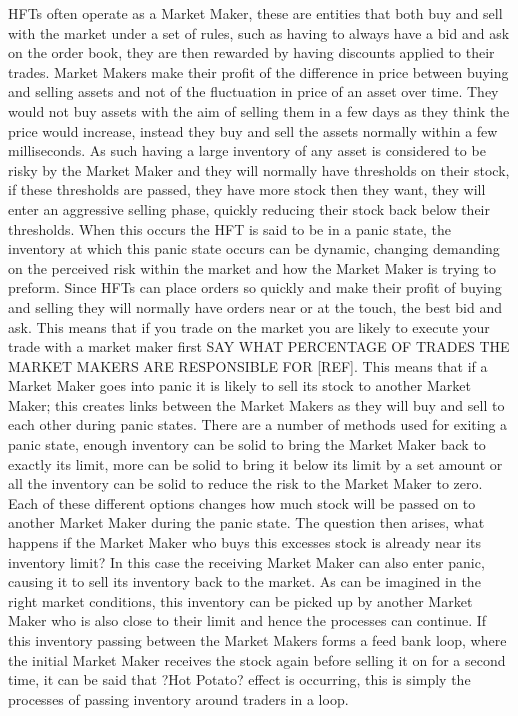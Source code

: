 \documentclass{article}
\begin{document}
HFTs often operate as a Market Maker, these are entities that both buy and sell with the market under a set of rules, such as having to always have a bid and ask on the order book, they are then rewarded by having discounts applied to their trades. Market Makers make their profit of the difference in price between buying and selling assets and not of the fluctuation in price of an asset over time. They would not buy assets with the aim of selling them in a few days as they think the price would increase, instead they buy and sell the assets normally within a few milliseconds. As such having a large inventory of any asset is considered to be risky by the Market Maker and they will normally have thresholds on their stock, if these thresholds are passed, they have more stock then they want, they will enter an aggressive selling phase, quickly reducing their stock back below their thresholds. When this occurs the HFT is said to be in a panic state, the inventory at which this panic state occurs can be dynamic, changing demanding on the perceived risk within the market and how the Market Maker is trying to preform. 
Since HFTs can place orders so quickly and make their profit of buying and selling they will normally have orders near or at the touch, the best bid and ask. This means that if you trade on the market you are likely to execute your trade with a market maker first SAY WHAT PERCENTAGE OF TRADES THE MARKET MAKERS ARE RESPONSIBLE FOR [REF]. This means that if a Market Maker goes into panic it is likely to sell its stock to another Market Maker; this creates links between the Market Makers as they will buy and sell to each other during panic states.  
There are a number of methods used for exiting a panic state, enough inventory can be solid to bring the Market Maker back to exactly its limit, more can be solid to bring it below its limit by a set amount or all the inventory can be solid to reduce the risk to the Market Maker to zero. Each of these different options changes how much stock will be passed on to another Market Maker during the panic state.
The question then arises, what happens if the Market Maker who buys this excesses stock is already near its inventory limit? In this case the receiving Market Maker can also enter panic, causing it to sell its inventory back to the market. As can be imagined in the right market conditions, this inventory can be picked up by another Market Maker who is also close to their limit and hence the processes can continue. If this inventory passing between the Market Makers forms a feed bank loop, where the initial Market Maker receives the stock again before selling it on for a second time, it can be said that ?Hot Potato? effect is occurring, this is simply the processes of passing inventory around traders in a loop.    
\end{document}
